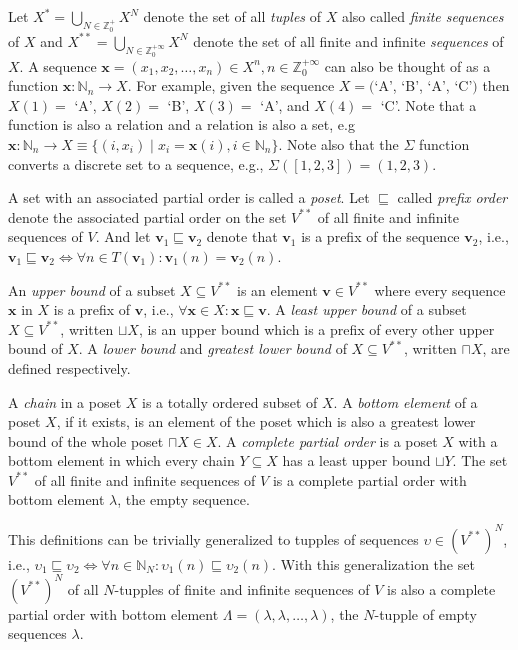 Let $X^* = \bigcup_{N \in \mathbb{Z}^+_0} X^N$ denote the set of all
\emph{tuples} of $X$ also called \emph{finite sequences} of $X$ and
$X^{**} = \bigcup_{N \in \mathbb{Z}^{+\infty}_0} X^N$ denote the set of all
finite and infinite \emph{sequences} of $X$. A sequence
$\mathbf{x} = (x_1,x_2,\ldots,x_n) \in X^n, n \in \mathbb{Z}^{+\infty}_0$
can also be thought of as a function $\mathbf{x} : \mathbb{N}_n \to X$.
For example, given the sequence $X = ($`A', `B', `A', `C'$)$ then
$X(1) =$ `A',  $X(2) =$ `B', $X(3) =$ `A', and $X(4) =$ `C'.
Note that a function is also a relation and a relation is also a set, e.g
$\mathbf{x} : \mathbb{N}_n \to X \equiv \{ (i,x_i) \mid x_i = \mathbf{x}(i), i \in \mathbb{N}_n \}$.
Note also that the $\Sigma$ function converts a discrete set to a sequence,
e.g., $\Sigma([1,2,3]) = (1,2,3)$.

A set with an associated partial order is called a
\emph{poset}. Let $\sqsubseteq$ called \emph{prefix order} denote the
associated partial order on the set $V^{**}$ of all finite and infinite sequences of $V$.
And let $\mathbf{v}_1 \sqsubseteq \mathbf{v}_2$ denote that
$\mathbf{v}_1$ is a prefix of the sequence $\mathbf{v}_2$, i.e.,
$\mathbf{v}_1 \sqsubseteq \mathbf{v}_2 \iff \forall{n \in T(\mathbf{v}_1)}: \mathbf{v}_1(n) = \mathbf{v}_2(n)$.

An \emph{upper bound} of a subset $X \subseteq V^{**}$ is an element
$\mathbf{v} \in V^{**}$ where every sequence $\mathbf{x}$ in $X$ is a
prefix of $\mathbf{v}$, i.e., $\forall{\mathbf{x} \in X}: \mathbf{x} \sqsubseteq \mathbf{v}$.
A \emph{least upper bound} of a subset $X \subseteq V^{**}$, written $\sqcup X$,
is an upper bound which is a prefix of every other upper bound of $X$.
A \emph{lower bound} and \emph{greatest lower bound} of $X \subseteq V^{**}$,
written $\sqcap X$, are defined respectively.

A \emph{chain} in a poset $X$ is a totally ordered subset of $X$. A
\emph{bottom element} of a poset $X$, if it exists, is an element of the
poset which is also a greatest lower bound of the whole poset $\sqcap X \in X$.
A \emph{complete partial order} is a poset $X$ with a bottom element
in which every chain $Y \subseteq X$ has a least upper bound
$\sqcup Y$. The set $V^{**}$ of all finite and infinite sequences of $V$
is a complete partial order with bottom element $\lambda$, the
empty sequence.

This definitions can be trivially generalized to tupples of sequences
$\upsilon \in (V^{**})^N$, i.e., $\upsilon_1 \sqsubseteq \upsilon_2 \iff
\forall{n \in \mathbb{N}_N}: \upsilon_1(n) \sqsubseteq \upsilon_2(n)$.
With this generalization the set $(V^{**})^N$ of all $N$-tupples of finite and
infinite sequences of $V$ is also a complete partial order with
bottom element $\Lambda = (\lambda, \lambda, \ldots, \lambda)$, the $N$-tupple
of empty sequences $\lambda$.

